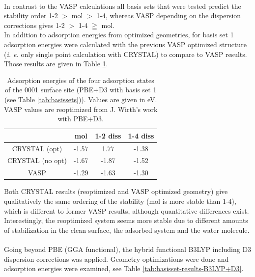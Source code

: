 \documentclass[11pt,DIV=13,BCOR=5mm,a4paper,headinclude]{scrbook}
\begin{document}
\\
In contrast to the VASP calculations all basis sets that were tested predict the stability order 1-2 $>$ mol $>$ 1-4, whereas VASP depending on the dispersion corrections gives 1-2 $>$ 1-4 $\geqq$ mol.
\\
In addition to adsorption energies from optimized geometries, for basis set 1 adsorption energies were calculated with the previous VASP optimized structure (\textit{i. e.} only single point calculation with CRYSTAL) to compare to VASP results.
Those results are given in Table \ref{tab:pbe-vasp-geom}.
\begin{table}[!h]
  \centering
   \caption{Adsorption energies of the four adsorption states of the 0001 surface site (PBE+D3 with basis set 1 (see Table \ref{tab:basissets})).
Values are given in eV.
VASP values are reoptimized from J. Wirth's work with PBE+D3.}
  \begin{tabular}{cccc}%
  \toprule
   &mol & 1-2 diss & 1-4 diss\\\midrule %
CRYSTAL (opt) & -1.57 & 1.77 &-1.38 \\%
   CRYSTAL (no opt)&-1.67 &-1.87 &-1.52\\%
  VASP &-1.29 &-1.63 &-1.30 \\%
  \bottomrule
  \end{tabular}
  \label{tab:pbe-vasp-geom}
\end{table}
Both CRYSTAL results (reoptimized and VASP optimized geometry) give qualitatively the same ordering of the stability (mol is more stable than 1-4), which is different to former VASP results, although quantitative differences exist.
Interestingly, the reoptimized system seems more stable due to different amounts of stabilization in the clean surface, the adsorbed system and the water molecule.
\\\\
Going beyond PBE (GGA functional), the hybrid functional B3LYP including D3 dispersion corrections was applied.
Geometry optimizations were done and adsorption energies were examined, see Table \ref{tab:basisset-results-B3LYP+D3}.
\end{document}
